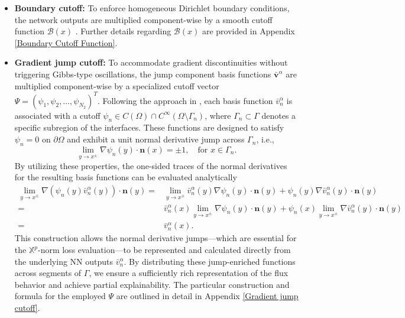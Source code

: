 \documentclass[oneside]{article}
\begin{document}
\begin{itemize}
    \item \textbf{Boundary cutoff: } To enforce homogeneous Dirichlet boundary conditions, the network outputs are multiplied component-wise by a smooth cutoff function $\mathcal{B}(x)$  \cite{berrone2023enforcing}. Further details regarding $\mathcal{B}(x)$ are provided in Appendix \ref{Boundary Cutoff Function}.

    \item \textbf{Gradient jump cutoff:} To accommodate gradient discontinuities without triggering Gibbs-type oscillations, the jump component basis functions $\bar{\mathbf{v}}^\alpha$ are multiplied component-wise by a specialized cutoff vector $\Psi = (\psi_1, \psi_2, \ldots, \psi_{N_2})^T$. Following the approach in \cite{berrone2023enforcing}, each basis function $\bar{v}^\alpha_n$ is associated with a cutoff $\psi_n \in C(\Omega) \cap C^\infty(\Omega \setminus \Gamma_n)$, where $\Gamma_n \subset \Gamma$ denotes a specific subregion of the interfaces. These functions are designed to satisfy $\psi_n = 0$ on $\partial\Omega$ and exhibit a unit normal derivative jump across $\Gamma_n$, i.e.,
    \begin{equation}
    \lim_{y \to x^\pm} \nabla \psi_n(y) \cdot \mathbf{n}(x) = \pm 1, \quad \text{for } x \in \Gamma_n.
    \end{equation}
    By utilizing these properties, the one-sided traces of the normal derivatives for the resulting basis functions can be evaluated analytically
    \begin{equation}
    \begin{split}
    \lim\limits_{y\to x^\pm} \nabla(\psi_n(y)\bar{v}^\alpha_n(y))\cdot \mathbf{n}(y)=&\lim\limits_{y\to x^\pm} \bar{v}^\alpha_n(y)\nabla\psi_n(y)\cdot \mathbf{n}(y)+\psi_n(y)\nabla \bar{v}^\alpha_n(y)\cdot \mathbf{n}(y)\\
    =& \bar{v}^\alpha_n(x)\lim\limits_{y\to x^\pm} \nabla\psi_n(y)\cdot \mathbf{n}(y)+ \psi_n(x)\lim\limits_{y\to x^\pm}\nabla \bar{v}^\alpha_n(y)\cdot \mathbf{n}(y)\\
    =&\bar{v}^\alpha_n(x).
    \end{split}
    \end{equation}
    This construction allows the normal derivative jumps—which are essential for the $\mathbb{X}^p$-norm loss evaluation—to be represented and calculated directly from the underlying NN outputs $\bar{v}^\alpha_n$. By distributing these jump-enriched functions across segments of $\Gamma$, we ensure a sufficiently rich representation of the flux behavior and achieve partial explainability.  The particular construction and formula for the employed $\Psi$ are outlined in detail in Appendix \ref{Gradient jump cutoff}.
    

\end{itemize}
\end{document}
